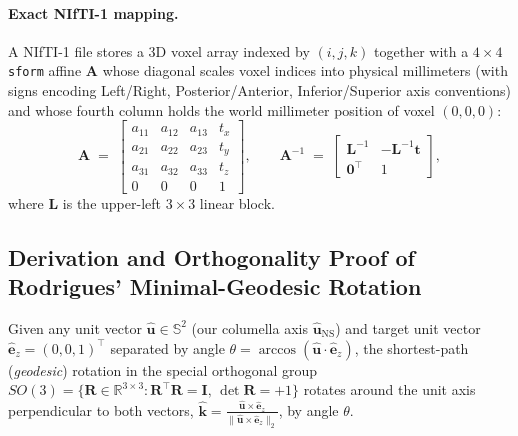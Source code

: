 \documentclass[10pt,a4paper]{article}
\renewcommand{\_}{\origunderscore\allowbreak}
\begin{document}
\paragraph{Exact NIfTI-1 mapping.} A NIfTI-1 file stores a 3D voxel array indexed by $(i, j, k)$ together with a $4\times 4$ \texttt{sform} affine $\mathbf{A}$ whose diagonal scales voxel indices into physical millimeters (with signs encoding Left/Right, Posterior/Anterior, Inferior/Superior axis conventions) and whose fourth column holds the world millimeter position of voxel $(0, 0, 0)$:
\begin{equation}
    \mathbf{A} \;=\;
    \begin{bmatrix}
        a_{11} & a_{12} & a_{13} & t_x \\
        a_{21} & a_{22} & a_{23} & t_y \\
        a_{31} & a_{32} & a_{33} & t_z \\
        0 & 0 & 0 & 1
    \end{bmatrix},
    \qquad
    \mathbf{A}^{-1} \;=\;
    \begin{bmatrix}
        \mathbf{L}^{-1} & -\mathbf{L}^{-1}\mathbf{t} \\
        \mathbf{0}^\top & 1
    \end{bmatrix},
\end{equation}
where $\mathbf{L}$ is the upper-left $3\times 3$ linear block.

\subsection{Derivation and Orthogonality Proof of Rodrigues' Minimal-Geodesic Rotation}

Given any unit vector $\hat{\mathbf{u}} \in \mathbb{S}^2$ (our columella axis $\hat{\mathbf{u}}_{\text{NS}}$) and target unit vector $\hat{\mathbf{e}}_z = (0, 0, 1)^\top$ separated by angle $\theta = \arccos(\hat{\mathbf{u}}\cdot \hat{\mathbf{e}}_z)$, the shortest-path (\emph{geodesic}) rotation in the special orthogonal group $SO(3) = \{\mathbf{R}\in\mathbb{R}^{3\times 3} : \mathbf{R}^\top\mathbf{R}=\mathbf{I},\, \det\mathbf{R}=+1\}$ rotates around the unit axis perpendicular to both vectors, $\hat{\mathbf{k}} = \frac{\hat{\mathbf{u}}\times\hat{\mathbf{e}}_z}{\|\hat{\mathbf{u}}\times\hat{\mathbf{e}}_z\|_2}$, by angle $\theta$.
\end{document}
